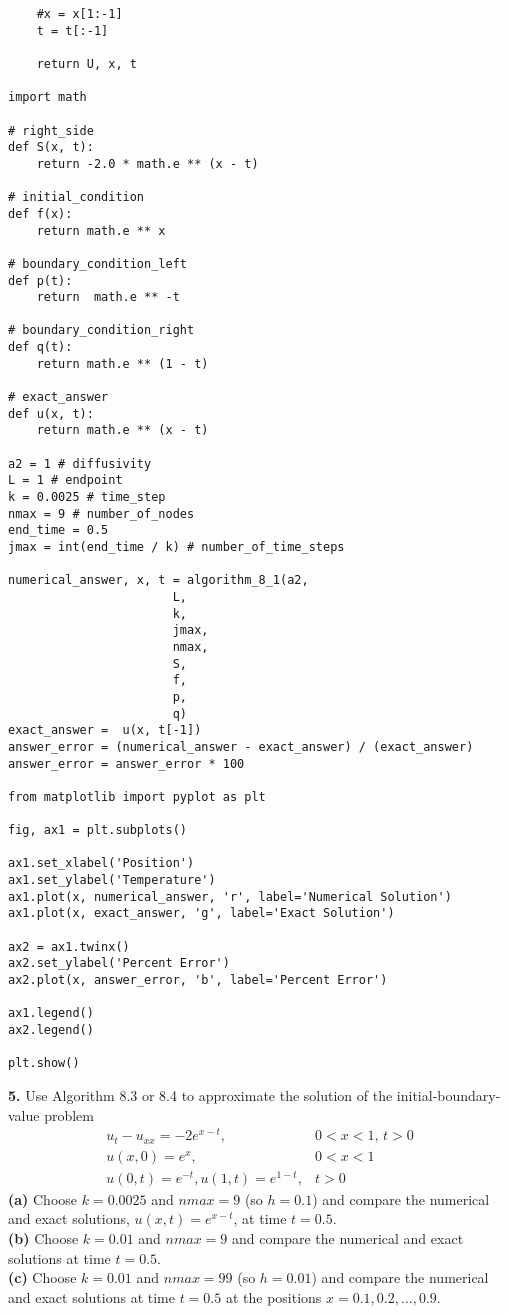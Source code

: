 \documentclass{amsbook}%
\theoremstyle{plain}
\numberwithin{equation}{section}
\begin{document}
\begin{small}
\begin{verbatim}
    #x = x[1:-1]
    t = t[:-1]
            
    return U, x, t

import math

# right_side
def S(x, t):
    return -2.0 * math.e ** (x - t)

# initial_condition
def f(x):
    return math.e ** x

# boundary_condition_left
def p(t):
    return  math.e ** -t

# boundary_condition_right
def q(t):
    return math.e ** (1 - t)

# exact_answer	
def u(x, t):
	return math.e ** (x - t)

a2 = 1 # diffusivity
L = 1 # endpoint
k = 0.0025 # time_step
nmax = 9 # number_of_nodes
end_time = 0.5
jmax = int(end_time / k) # number_of_time_steps

numerical_answer, x, t = algorithm_8_1(a2,
                       L,
                       k,
                       jmax,
                       nmax,
                       S,
                       f,
                       p,
                       q)
exact_answer = 	u(x, t[-1])
answer_error = (numerical_answer - exact_answer) / (exact_answer)
answer_error = answer_error * 100

from matplotlib import pyplot as plt

fig, ax1 = plt.subplots()

ax1.set_xlabel('Position')
ax1.set_ylabel('Temperature')
ax1.plot(x, numerical_answer, 'r', label='Numerical Solution')
ax1.plot(x, exact_answer, 'g', label='Exact Solution')

ax2 = ax1.twinx()
ax2.set_ylabel('Percent Error')
ax2.plot(x, answer_error, 'b', label='Percent Error')

ax1.legend()
ax2.legend()

plt.show()
\end{verbatim}
\end{small}
		
		\noindent\textbf{5.} Use Algorithm 8.3 or 8.4 to approximate the solution of the initial-boundary-value problem 
		\begin{align}
			u_t-u_{xx}=-2e^{x-t}, & 0<x<1,\, t>0\\
			u(x,0)=e^x, & 0<x<1\\
			u(0,t)=e^{-t}, u(1,t)=e^{1-t}, & t>0
		\end{align}
		\textbf{(a)} Choose $k=0.0025$ and $nmax=9$ (so $h=0.1$) and compare the numerical and exact solutions, $u(x,t)=e^{x-t}$, at time $t=0.5$.\\
		\textbf{(b)} Choose $k=0.01$ and $nmax=9$ and compare the numerical and exact solutions at time $t=0.5$.\\
		\textbf{(c)} Choose $k=0.01$ and $nmax=99$ (so $h=0.01$) and compare the numerical and exact solutions at time $t=0.5$ at the positions $x=0.1,0.2,\ldots ,0.9$.
		\\[12pt]
		
\end{document}
